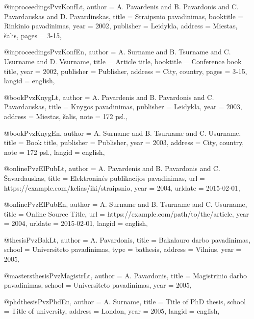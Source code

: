 @inproceedings{PvzKonfLt,
    author = {A. Pavardenis and B. Pavardonis and C. Pavardauskas and D.
              Pavardinskas},
    title = {Straipsnio pavadinimas},
    booktitle = {Rinkinio pavadinimas},
    year = {2002},
    publisher = {Leidykla},
    address = {Miestas, šalis},
    pages = {3-15},
}

@inproceedings{PvzKonfEn,
    author = {A. Surname and B. Tsurname and C. Usurname and D. Vsurname},
    title = {Article title},
    booktitle = {Conference book title},
    year = {2002},
    publisher = {Publisher},
    address = {City, country},
    pages = {3-15},
    langid = {english},
}

@book{PvzKnygLt,
    author = {A. Pavardenis and B. Pavardonis and C. Pavardauskas},
    title = {Knygos pavadinimas},
    publisher = {Leidykla},
    year = {2003},
    address = {Miestas, šalis},
    note = {172 psl.},
}

@book{PvzKnygEn,
    author = {A. Surname and B. Tsurname and C. Usurname},
    title = {Book title},
    publisher = {Publisher},
    year = {2003},
    address = {City, country},
    note = {172 psl.},
    langid = {english},
}

@online{PvzElPubLt,
    author = {A. Pavardenis and B. Pavardonis and C. Šavardauskas},
    title = {Elektroninės publikacijos pavadinimas},
    url = {https://example.com/kelias/iki/straipsnio},
    year = {2004},
    urldate = {2015-02-01},
}

@online{PvzElPubEn,
    author = {A. Surname and B. Tsurname and C. Usurname},
    title = {Online Source Title},
    url = {https://example.com/path/to/the/article},
    year = {2004},
    urldate = {2015-02-01},
    langid = {english},
}

@thesis{PvzBakLt,
    author = {A. Pavardonis},
    title = {Bakalauro darbo pavadinimas},
    school = {Universiteto pavadinimas},
    type = {bathesis},
    address = {Vilnius},
    year = {2005},
}

@mastersthesis{PvzMagistrLt,
    author = {A. Pavardonis},
    title = {Magistrinio darbo pavadinimas},
    school = {Universiteto pavadinimas},
    year = {2005},
}

@phdthesis{PvzPhdEn,
    author = {A. Surname},
    title = {Title of PhD thesis},
    school = {Title of university},
    address = {London},
    year = {2005},
    langid = {english},
}
